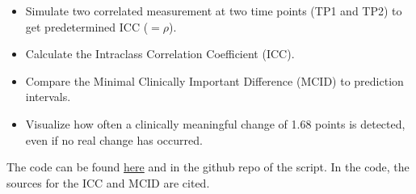 \documentclass[
]{book}
\providecommand{\tightlist}{%
  \setlength{\itemsep}{0pt}\setlength{\parskip}{0pt}}
\begin{document}
\begin{itemize}
\tightlist
\item
  Simulate two correlated measurement at two time points (TP1 and TP2)
  to get predetermined ICC (\(=\rho\)).
\item
  Calculate the Intraclass Correlation Coefficient (ICC).
\item
  Compare the Minimal Clinically Important Difference (MCID) to prediction intervals.
\item
  Visualize how often a clinically meaningful change of 1.68 points is
  detected, even if no real change has occurred.
\end{itemize}

The code can be found \href{https://github.com/jdegenfellner/ICC_MCID/blob/main/ICC_MCID.R}{here}
and in the github repo of the script. In the code, the sources for the ICC and MCID are
cited.
\end{document}
